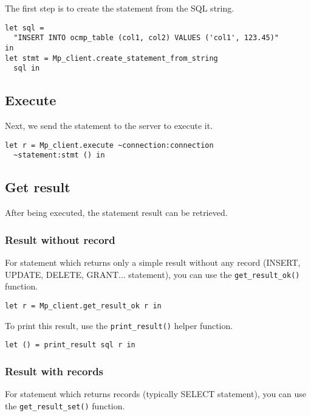\documentclass[a4paper, english, 11pt]{article}
\begin{document}
The first step is to create the statement from the SQL string.

\begin{verbatim}
let sql = 
  "INSERT INTO ocmp_table (col1, col2) VALUES ('col1', 123.45)"
in
let stmt = Mp_client.create_statement_from_string
  sql in
\end{verbatim}

\subsection{Execute}

Next, we send the statement to the server to execute it.

\begin{verbatim}
let r = Mp_client.execute ~connection:connection 
  ~statement:stmt () in
\end{verbatim}

\subsection{Get result}

After being executed, the statement result can be retrieved.

\subsubsection{Result without record}

For statement which returns only a simple result without any record (INSERT, UPDATE, DELETE, GRANT... statement), you can use the \texttt{get\_result\_ok()} function.

\begin{verbatim}
let r = Mp_client.get_result_ok r in
\end{verbatim}

To print this result, use the \texttt{print\_result()} helper function.

\begin{verbatim}
let () = print_result sql r in
\end{verbatim}

\subsubsection{Result with records}

For statement which returns records (typically SELECT statement), you can use the \texttt{get\_result\_set()} function.
\end{document}
